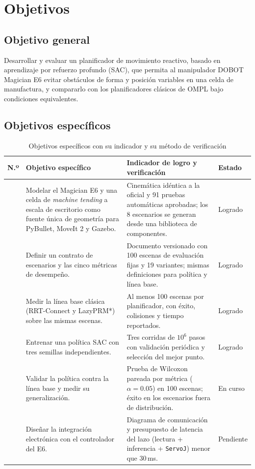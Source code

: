 \documentclass[11pt,a4paper,twoside]{article}
\begin{document}
\section{Objetivos}

\subsection{Objetivo general}

Desarrollar y evaluar un planificador de movimiento reactivo, basado en aprendizaje por refuerzo profundo (SAC), que permita al manipulador DOBOT Magician E6 evitar obstáculos de forma y posición variables en una celda de manufactura, y compararlo con los planificadores clásicos de OMPL bajo condiciones equivalentes.

\subsection{Objetivos específicos}

\begin{table}[H]
\centering
\caption{Objetivos específicos con su indicador y su método de verificación}
\label{tab:oe}
\small
\renewcommand{\arraystretch}{1.3}
\begin{tabularx}{\textwidth}{@{}>{\raggedright\arraybackslash}p{0.7cm}>{\raggedright\arraybackslash}X>{\raggedright\arraybackslash}X>{\raggedright\arraybackslash}p{2.0cm}@{}}
\toprule
\textbf{N.º} & \textbf{Objetivo específico} & \textbf{Indicador de logro y verificación} & \textbf{Estado} \\
\midrule
1 & Modelar el Magician E6 y una celda de \emph{machine tending} a escala de escritorio como fuente única de geometría para PyBullet, MoveIt 2 y Gazebo. & Cinemática idéntica a la oficial y 91 pruebas automáticas aprobadas; los 8 escenarios se generan desde una biblioteca de componentes. & Logrado \\
2 & Definir un contrato de escenarios y las cinco métricas de desempeño. & Documento versionado con 100 escenas de evaluación fijas y 19 variantes; mismas definiciones para política y línea base. & Logrado \\
3 & Medir la línea base clásica (RRT-Connect y LazyPRM*) sobre las mismas escenas. & Al menos 100 escenas por planificador, con éxito, colisiones y tiempo reportados. & Logrado \\
4 & Entrenar una política SAC con tres semillas independientes. & Tres corridas de $10^6$ pasos con validación periódica y selección del mejor punto. & Logrado \\
5 & Validar la política contra la línea base y medir su generalización. & Prueba de Wilcoxon pareada por métrica ($\alpha=0.05$) en 100 escenas; éxito en los escenarios fuera de distribución. & En curso \\
6 & Diseñar la integración electrónica con el controlador del E6. & Diagrama de comunicación y presupuesto de latencia del lazo (lectura + inferencia + \texttt{ServoJ}) menor que 30\,ms. & Pendiente \\
\bottomrule
\end{tabularx}
\end{table}
\end{document}
